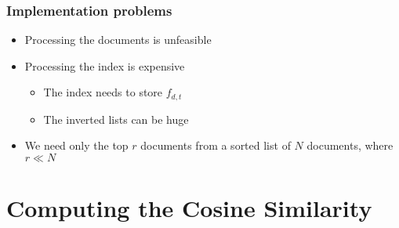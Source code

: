 \documentclass[svgnames]{beamer}
\newcommand{\fdt}{\ensuremath{f_{d,t}}}
\begin{document}
\begin{frame}
  \frametitle{Implementation problems}
  
  \begin{block}{}
    \begin{itemize}
    \item Processing the documents is unfeasible
    \item Processing the index is expensive
      \begin{itemize}
      \item The index needs to store \fdt
      \item The inverted lists can be huge
      \end{itemize}
    \item We need only the top $r$ documents from a sorted list of $N$
      documents, where $r \ll N$
    \end{itemize}
  \end{block}
\end{frame}


\section{Computing the Cosine Similarity}

\setcounter{num}{0}
\newcommand{\inum}{\addtocounter{num}{1}\thenum}
\end{document}

